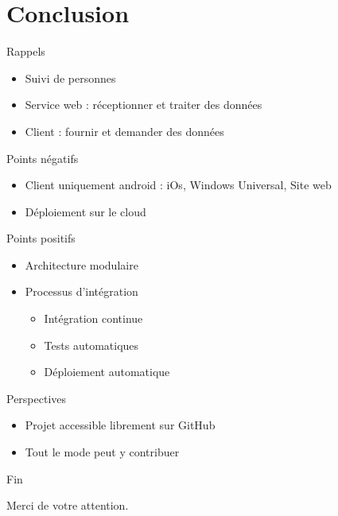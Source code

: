 \documentclass{beamer} %
\begin{document}

  \section{Conclusion}
  \begin{frame}{\secname}
      \begin{block}{Rappels}
        \begin{itemize}
          \item Suivi de personnes
          \item Service web : réceptionner et traiter des données
          \item Client : fournir et demander des données
        \end{itemize}
      \end{block}

      \pause

      \begin{alertblock}{Points négatifs}
        \begin{itemize}
          \item Client uniquement android : iOs, Windows Universal, Site web
          \item Déploiement sur le cloud
        \end{itemize}
      \end{alertblock}

  \end{frame}

  \begin{frame}{\secname}
    \begin{exampleblock}{Points positifs}
        \begin{itemize}
          \item Architecture modulaire
          \item Processus d'intégration
          \begin{itemize}
            \item Intégration continue
            \item Tests automatiques
            \item Déploiement automatique
          \end{itemize}
        \end{itemize}
      \end{exampleblock}

      \pause

      \begin{block}{Perspectives}
        \begin{itemize}
          \item Projet accessible librement sur GitHub
          \item Tout le mode peut y contribuer
        \end{itemize}
      \end{block}
  \end{frame}


  \begin{frame}{Fin}
    \begin{center}
      Merci de votre attention.
    \end{center}
  \end{frame}
\end{document}
